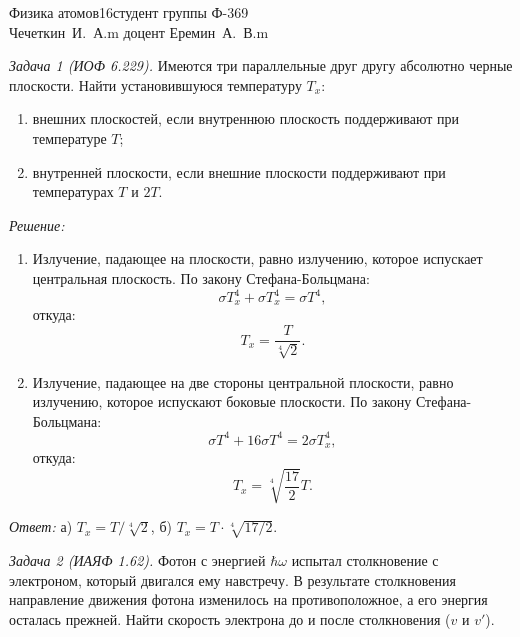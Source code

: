 




\renewcommand{\labelenumi}{\asbuk{enumi})}
\newcommand{\mr}[1]{\mathrm{#1}}


{Физика атомов}{}{16}{студент группы Ф-369\\Чечеткин~И.~А.}{m}
{доцент Еремин~А.~В.}{m}
\newpage

\emph{Задача 1 (ИОФ 6.229).}
Имеются три параллельные друг другу абсолютно черные плоскости.
Найти установившуюся температуру \( T_x \):
\vspace*{-.8em}
\begin{enumerate} \itemsep-.5em
    \item внешних плоскостей, если внутреннюю плоскость поддерживают при
    температуре \( T \);
    \item внутренней плоскости, если внешние плоскости поддерживают при
    температурах \( T \) и \( 2T \).
\end{enumerate}

\vspace*{2em}
\emph{Решение:}
\begin{enumerate}
    \item Излучение, падающее на плоскости, равно излучению, которое испускает
    центральная плоскость. По закону Стефана-Больцмана:
    \[
        \sigma T_x^4 + \sigma T_x^4 = \sigma T^4,
    \]
    откуда:
    \[
        T_x = \frac{T}{\sqrt[4]{2}}.
    \]
    \item Излучение, падающее на две стороны центральной плоскости, равно
    излучению, которое испускают боковые плоскости. По закону Стефана-Больцмана:
    \[
        \sigma T^4 + 16\sigma T^4 = 2\sigma T_x^4,
    \]
    откуда:
    \[
        T_x = \sqrt[4]{\frac{17}{2}}T.
    \]
\end{enumerate}
\vspace*{2em}        
\emph{Ответ:} а) \( T_x = T/\sqrt[4]{2} \), б) \( T_x = T\cdot\sqrt[4]{17/2} \). 
\newpage

\emph{Задача 2 (ИАЯФ 1.62).}
Фотон с энергией \( \hbar\omega \) испытал столкновение с электроном, который
двигался ему навстречу. В результате столкновения направление движения фотона
изменилось на противоположное, а его энергия осталась прежней. Найти скорость
электрона до и после столкновения (\( v \) и \( v' \)).

